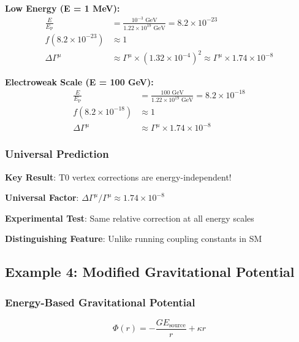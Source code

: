 \documentclass[12pt,a4paper]{article}
\newcommand{\EP}{E_{\text{P}}}
\begin{document}
	\textbf{Low Energy (E = 1 MeV):}
	\begin{align}
		\frac{E}{\EP} &= \frac{10^{-3} \text{ GeV}}{1.22 \times 10^{19} \text{ GeV}} = 8.2 \times 10^{-23} \\
		f(8.2 \times 10^{-23}) &\approx 1 \\
		\Delta\Gamma^{\mu} &\approx \Gamma^{\mu} \times (1.32 \times 10^{-4})^2 \approx \Gamma^{\mu} \times 1.74 \times 10^{-8}
		\label{eq:low_energy_vertex}
	\end{align}
	
	\textbf{Electroweak Scale (E = 100 GeV):}
	\begin{align}
		\frac{E}{\EP} &= \frac{100 \text{ GeV}}{1.22 \times 10^{19} \text{ GeV}} = 8.2 \times 10^{-18} \\
		f(8.2 \times 10^{-18}) &\approx 1 \\
		\Delta\Gamma^{\mu} &\approx \Gamma^{\mu} \times 1.74 \times 10^{-8}
		\label{eq:high_energy_vertex}
	\end{align}
	
	\subsubsection{Universal Prediction}
	\begin{tcolorbox}[colback=yellow!5!white,colframe=orange!75!black,title=Energy-Independent QED Corrections]
		\textbf{Key Result}: T0 vertex corrections are energy-independent!
		
		\textbf{Universal Factor}: $\Delta\Gamma^{\mu}/\Gamma^{\mu} \approx 1.74 \times 10^{-8}$
		
		\textbf{Experimental Test}: Same relative correction at all energy scales
		
		\textbf{Distinguishing Feature}: Unlike running coupling constants in SM
	\end{tcolorbox}
	
	\subsection{Example 4: Modified Gravitational Potential}
	\label{subsec:gravitational_potential_energy}
	
	\subsubsection{Energy-Based Gravitational Potential}
	\begin{equation}
		\Phi(r) = -\frac{GE_{\text{source}}}{r} + \kappa r
		\label{eq:energy_gravitational_potential}
	\end{equation}
	
\end{document}
